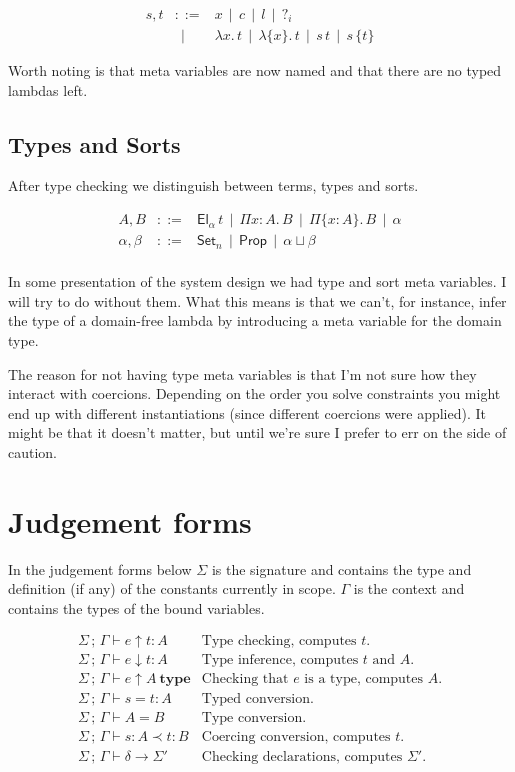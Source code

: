 \documentclass[a4paper,11pt]{article}
\newcommand\Coloneqq{\mathrel{::=}}
\newcommand\OR{~~|~~}
\newcommand\Hid[1]{\{#1\}}
\newcommand\lam[1]{\lambda#1.\,}
\newcommand\hlam[1]{\lam{\Hid{#1}}}
\newcommand\vPi[2]{\Pi#1:#2.\,}
\newcommand\vhPi[2]{\Pi\{#1:#2\}.\,}
\newcommand\Set[1]{\mathsf{Set}_#1}
\newcommand\Prop{\mathsf{Prop}}
\newcommand\el{\mathsf{El}}
\newcommand\El[1]{\el_{#1}\,}
\renewcommand\Check[5]{#1\,;\,#2\vdash#3\uparrow#4:#5}
\newcommand\Infer[5]{#1\,;\,#2\vdash#3\downarrow#4:#5}
\newcommand\IsType[4]{#1\,;\,#2\vdash#3\uparrow#4~\mathbf{type}}
\newcommand\Equal[5]{#1\,;\,#2\vdash#3=#4:#5}
\newcommand\TEqual[4]{#1\,;\,#2\vdash#3=#4}
\newcommand\Expand[6]{#1\,;\,#2\vdash#3:#4\prec#5:#6}
\newcommand\CheckDecl[4]{#1\,;\,#2\vdash#3\to#4}
\begin{document}
    \[\begin{array}{lcl}
	s,t & \Coloneqq & x \OR c \OR l \OR ?_i \\
	    & \OR & \lam xt \OR \hlam xt \OR s\,t \OR s\,\Hid t
    \end{array}\]

    Worth noting is that meta variables are now named and that there are no
    typed lambdas left.

\subsection{Types and Sorts}

    After type checking we distinguish between terms, types and sorts.

    \[\begin{array}{lcl}
	A,B & \Coloneqq & \El\alpha t \OR \vPi xAB \OR \vhPi xAB \OR \alpha \\
	\alpha,\beta & \Coloneqq & \Set n \OR \Prop \OR \alpha\sqcup\beta \\
    \end{array}\]

    In some presentation of the system design we had type and sort meta
    variables. I will try to do without them. What this means is that we can't,
    for instance, infer the type of a domain-free lambda by introducing a meta
    variable for the domain type.

    The reason for not having type meta variables is that I'm not sure how they
    interact with coercions.  Depending on the order you solve constraints you
    might end up with different instantiations (since different coercions were
    applied).  It might be that it doesn't matter, but until we're sure I
    prefer to err on the side of caution.

\section{Judgement forms}

    In the judgement forms below $\Sigma$ is the signature and contains the
    type and definition (if any) of the constants currently in scope. $\Gamma$
    is the context and contains the types of the bound variables.

    \[\begin{array}{ll}
	\Check\Sigma\Gamma etA	    & \mbox{Type checking, computes $t$.} \\
	\Infer\Sigma\Gamma etA	    & \mbox{Type inference, computes $t$ and $A$.} \\
	\IsType\Sigma\Gamma eA	    & \mbox{Checking that $e$ is a type, computes $A$.} \\
	\Equal\Sigma\Gamma stA	    & \mbox{Typed conversion.} \\
	\TEqual\Sigma\Gamma AB	    & \mbox{Type conversion.} \\
	\Expand\Sigma\Gamma sAtB    & \mbox{Coercing conversion, computes $t$.} \\
	\CheckDecl\Sigma\Gamma\delta{\Sigma'} & \mbox{Checking declarations, computes $\Sigma'$.}
    \end{array}\]
\end{document}
